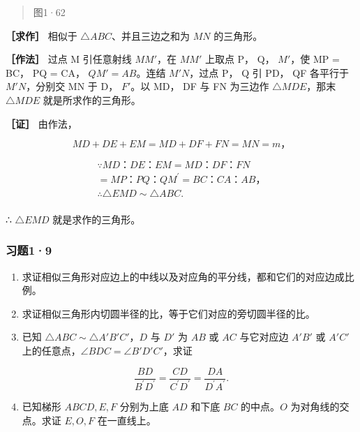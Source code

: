 \begin{quote}
图1·62
\end{quote}

\textbf{［求作］} 相似于 \(\triangle ABC\)、并且三边之和为 \(MN\)
的三角形。

\textbf{［作法］} 过点 M 引任意射线 \(MM'\)，在 \(MM'\) 上取点 P， Q，
\(M'\)，使 MP = BC， PQ = CA， \(QM' = AB\)。连结 \(M'N\)，过点 P， Q 引
PD， QF 各平行于 \(M'N\)，分别交 MN 于 D， \(F'\)。以 MD， DF 与 FN
为三边作 \(\triangle MDE\)，那末 \(\triangle MDE\) 就是所求作的三角形。

\textbf{［证］} 由作法，

\[
M D + D E + E M = M D + D F + F N = M N = m\text{，}
\]

\[
\begin{array}{l} \because M D\text{：} D E\text{：} E M = M D\text{：} D F\text{：} F N \\ = M P\text{：} P Q\text{：} Q M ^ {\prime} = B C\text{：} C A\text{：} A B\text{，} \\ \therefore \triangle E M D \sim \triangle A B C. \\ \end{array}
\]

∴ \(\triangle EMD\) 就是求作的三角形。

\subsubsection{习题1·9}

\begin{enumerate}
\item
  求证相似三角形对应边上的中线以及对应角的平分线，都和它们的对应边成比例。
\item
  求证相似三角形内切圆半径的比，等于它们对应的旁切圆半径的比。
\item
  已知 \(\triangle ABC \sim \triangle A'B'C'\)，\(D\) 与 \(D'\) 为
  \(AB\) 或 \(AC\) 与它对应边 \(A'B'\) 或 \(A'C'\)
  上的任意点，\(\angle BDC = \angle B'D'C'\)，求证
\end{enumerate}

\[
\frac {B D}{B ^ {\prime} D ^ {\prime}} = \frac {C D}{C ^ {\prime} D ^ {\prime}} = \frac {D A}{D ^ {\prime} A ^ {\prime}}.
\]

\begin{enumerate}
\setcounter{enumi}{3}
\item
  已知梯形 \(ABCD, E, F\) 分别为上底 \(AD\) 和下底 \(BC\) 的中点。\(O\)
  为对角线的交点。求证 \(E, O, F\) 在一直线上。
\end{enumerate}

